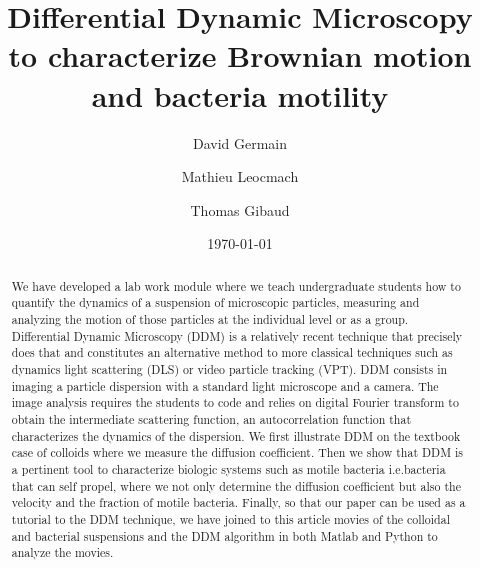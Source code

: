 \documentclass[%
 aip,
 jmp,%
 amsmath,amssymb,
reprint,%
]{revtex4-1}
\newcommand{\tg}[1]{{\color{magenta}#1}} %
\begin{document}

\title[Differential Dynamic Microscopy to characterize Brownian motion and bacteria motility]{Differential Dynamic Microscopy\\ to characterize Brownian motion and bacteria motility}%

\author{David Germain}
\author{Mathieu Leocmach}
\author{Thomas Gibaud}

\date{\today}%

\begin{abstract}
We have developed a lab work module where we teach undergraduate students how to quantify the dynamics of a suspension of microscopic particles, measuring and analyzing the motion of those particles at the individual level or as a group. 
Differential Dynamic Microscopy (DDM) is a relatively recent technique that precisely does that and constitutes an alternative method to more classical techniques such as dynamics light scattering (DLS) or video particle tracking (VPT). DDM consists in imaging a particle dispersion with a standard light microscope and a camera. The image analysis requires the students to code and relies on digital Fourier transform to obtain the intermediate scattering function, an autocorrelation function that characterizes the dynamics of the dispersion. We first illustrate DDM on the textbook case of colloids where we measure the diffusion coefficient. Then we show that DDM is a pertinent tool to characterize biologic systems such as motile bacteria \tg{i.e.bacteria that can self propel}, where we not only determine the diffusion coefficient but also the velocity and the fraction of motile bacteria. Finally, so that  our paper can be used as a tutorial to the DDM technique, we have joined to this article movies of the colloidal and bacterial suspensions and the DDM algorithm in both Matlab and Python to analyze the movies.
\end{abstract}

\maketitle
\end{document}
